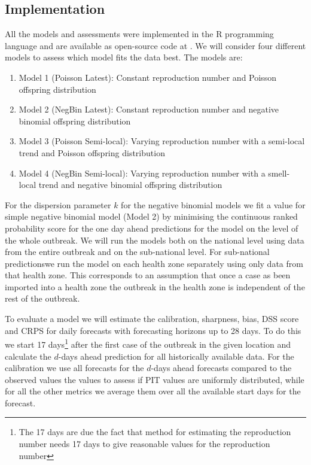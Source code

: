 \documentclass[12pt]{article}
\begin{document}
\subsection{Implementation}
All the models and assessments were implemented in the R programming language \cite{rcoreteamLanguageEnvironmentStatistical2018} and are available as open-source code at \cite{GulfaMscEbola}. We will consider four different models to assess which model fits the data best. The models are:

\begin{enumerate}
\item{Model 1 (Poisson Latest): Constant reproduction number and Poisson offspring distribution}
\item{Model 2 (NegBin Latest): Constant reproduction number and negative binomial offspring distribution}
\item{Model 3 (Poisson Semi-local): Varying reproduction number with a semi-local trend and Poisson offspring distribution}
\item{Model 4 (NegBin Semi-local): Varying reproduction number with a smell-local trend and negative binomial offspring distribution}
\end{enumerate}

For the dispersion parameter $k$ for the negative binomial models we fit a value for simple negative binomial model (Model 2) by minimising the continuous ranked probability score for the one day ahead predictions for the model on the level of the whole outbreak. We will run the models both on the national level using data from the entire outbreak and on the sub-national level. For sub-national predictionswe run the model on each health zone separately using only data from that health zone. This corresponds to an assumption that once a case as been imported into a health zone the outbreak in the health zone is independent of the rest of the outbreak.

To evaluate a model we will estimate the calibration, sharpness, bias, DSS score and CRPS for daily forecasts with forecasting horizons up to 28 days. To do this we start 17 days\footnote{The 17 days are due the fact that method for estimating the reproduction number needs 17 days to give reasonable values for the reproduction number} after the first case of the outbreak in the given location and calculate the $d$-days ahead prediction for all historically available data. For the calibration we use all forecasts for the $d$-days ahead forecasts compared to the observed values the values to assess if PIT values are uniformly distributed, while for all the other metrics we average them over all the available start days for the forecast.
\end{document}
